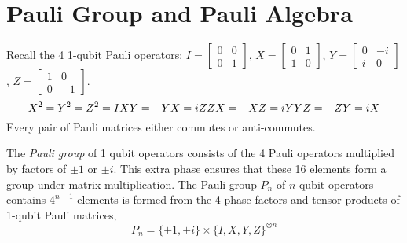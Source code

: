 

\clearpage

\section{Pauli Group and Pauli Algebra}

Recall the 4 1-qubit Pauli operators: $I=[\begin{smallmatrix} 0& 0 \\ 0 & 1 \end{smallmatrix}]$,
$X=[\begin{smallmatrix}0 & 1 \\ 1 & 0 \end{smallmatrix}]$, $Y=[\begin{smallmatrix}0 & -i \\ i & 0 \end{smallmatrix}]$, $Z=[\begin{smallmatrix}1 & 0 \\ 0 & -1 \end{smallmatrix}]$.
\[
X^2 = Y^2 = Z^2 = I  \\
XY = -YX = iZ \notag\\
ZX = -XZ = iY \notag\\
YZ = -ZY = iX \notag
\]
Every pair of Pauli matrices either commutes or anti-commutes. 

The {\sl Pauli group} of 1 qubit operators  consists of the 4 Pauli operators  multiplied by factors of $\pm 1$ or $\pm i$. This extra phase ensures that these 16 elements form a group under matrix multiplication. The Pauli group $P_n$ of $n$ qubit operators contains $4^{n+1}$ elements is formed from the 4 phase factors and tensor products of 1-qubit Pauli matrices, 
\[
P_n = \{\pm 1, \pm i\} \times \{I, X, Y, Z\}^{\otimes n}
\]


